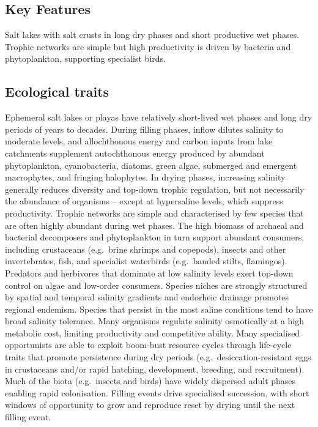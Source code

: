 \documentclass[
  letterpaper,
  DIV=11,
  numbers=noendperiod]{scrartcl}
\begin{document}
\subsection{Key Features}\label{key-features-14}

Salt lakes with salt crusts in long dry phases and short productive wet
phases. Trophic networks are simple but high productivity is driven by
bacteria and phytoplankton, supporting specialist birds.

\subsection{Ecological traits}\label{ecological-traits-14}

Ephemeral salt lakes or playas have relatively short-lived wet phases
and long dry periods of years to decades. During filling phases, inflow
dilutes salinity to moderate levels, and allochthonous energy and carbon
inputs from lake catchments supplement autochthonous energy produced by
abundant phytoplankton, cyanobacteria, diatoms, green algae, submerged
and emergent macrophytes, and fringing halophytes. In drying phases,
increasing salinity generally reduces diversity and top-down trophic
regulation, but not necessarily the abundance of organisms -- except at
hypersaline levels, which suppress productivity. Trophic networks are
simple and characterised by few species that are often highly abundant
during wet phases. The high biomass of archaeal and bacterial
decomposers and phytoplankton in turn support abundant consumers,
including crustaceans (e.g.~brine shrimps and copepods), insects and
other invertebrates, fish, and specialist waterbirds (e.g.~banded
stilts, flamingos). Predators and herbivores that dominate at low
salinity levels exert top-down control on algae and low-order consumers.
Species niches are strongly structured by spatial and temporal salinity
gradients and endorheic drainage promotes regional endemism. Species
that persist in the most saline conditions tend to have broad salinity
tolerance. Many organisms regulate salinity osmotically at a high
metabolic cost, limiting productivity and competitive ability. Many
specialised opportunists are able to exploit boom-bust resource cycles
through life-cycle traits that promote persistence during dry periods
(e.g.~desiccation-resistant eggs in crustaceans and/or rapid hatching,
development, breeding, and recruitment). Much of the biota (e.g.~insects
and birds) have widely dispersed adult phases enabling rapid
colonisation. Filling events drive specialised succession, with short
windows of opportunity to grow and reproduce reset by drying until the
next filling event.
\end{document}
